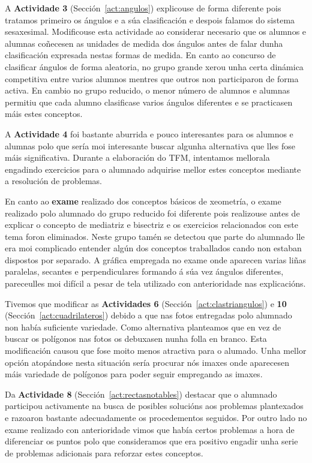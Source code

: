 A \textbf{Actividade 3} (Sección~\ref{act:angulos}) explicouse de forma diferente pois tratamos primeiro os ángulos e a súa clasificación e despois falamos do sistema sesaxesimal. Modificouse esta actividade ao considerar necesario que os alumnos e alumnas coñecesen as unidades de medida dos ángulos antes de falar dunha clasificación expresada nestas formas de medida. En canto ao concurso de clasificar ángulos de forma aleatoria, no grupo grande xerou unha certa dinámica competitiva entre varios alumnos mentres que outros non participaron de forma activa. En cambio no grupo reducido, o menor número de alumnos e alumnas permitiu que cada alumno clasificase varios ángulos diferentes e se practicasen máis estes conceptos.

A \textbf{Actividade 4} foi bastante aburrida e pouco interesantes para os alumnos e alumnas polo que sería moi interesante buscar algunha alternativa que lles fose máis significativa. Durante a elaboración do TFM, intentamos mellorala engadindo exercicios para o alumnado adquirise mellor estes conceptos mediante a resolución de problemas.

En canto ao \textbf{exame} realizado dos conceptos básicos de xeometría, o exame realizado polo alumnado do grupo reducido foi diferente pois realizouse antes de explicar o concepto de mediatriz e bisectriz e os exercicios relacionados con este tema foron eliminados. Neste grupo tamén se detectou que parte do alumnado lle era moi complicado entender algún dos conceptos traballados cando non estaban dispostos por separado. A gráfica empregada no exame onde aparecen varias liñas paralelas, secantes e perpendiculares formando á súa vez ángulos diferentes, pareceulles moi difícil a pesar de tela utilizado con anterioridade nas explicacións.

Tivemos que modificar as \textbf{Actividades 6} (Sección~\ref{act:clastriangulos}) e \textbf{10} (Sección~\ref{act:cuadrilateros}) debido a que nas fotos entregadas polo alumnado non había suficiente variedade. Como alternativa planteamos que en vez de buscar os polígonos nas fotos os debuxasen nunha folla en branco. Esta modificación causou que fose moito menos atractiva para o alumado. Unha mellor opción atopándose nesta situación sería procurar nós imaxes onde aparecesen máis variedade de polígonos para poder seguir empregando as imaxes.

Da \textbf{Actividade 8} (Sección~\ref{act:rectasnotables}) destacar que o alumnado participou activamente na busca de posibles solucións aos problemas plantexados e razoaron bastante adecuadamente os procedementos seguidos. Por outro lado no exame realizado con anterioridade vimos que había certos problemas a hora de diferenciar os puntos polo que consideramos que era positivo engadir unha serie de problemas adicionais para reforzar estes conceptos.

